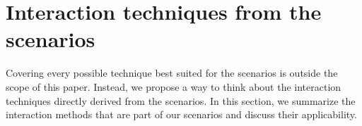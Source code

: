 \documentclass[review,journal]{vgtc}         %
\begin{document}








\section{Interaction techniques from the scenarios} \label{sec:techniques}
Covering every possible technique best suited for the scenarios is outside the scope of this paper.
Instead, we propose a way to think about the interaction techniques directly derived from the scenarios.
In this section, we summarize the interaction methods that are part of our scenarios and discuss their applicability.
\end{document}
